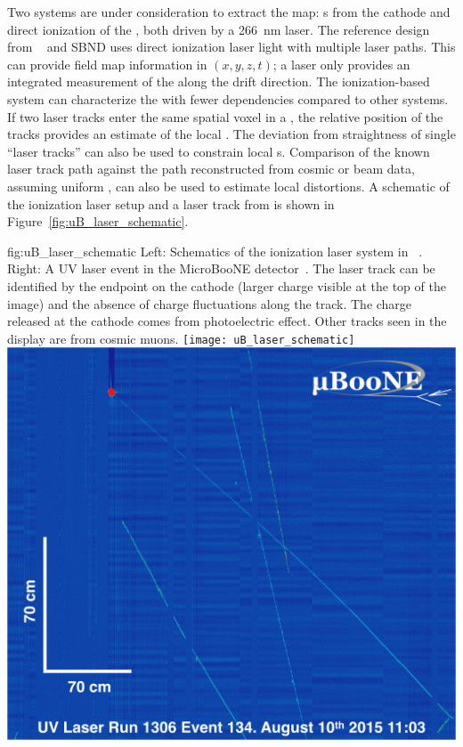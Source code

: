 Two systems are under consideration to extract the \efield map: \phel{}s from the \lartpc cathode and direct ionization of the , both driven by a \SI{266}{\nano\m} laser.  The reference design from ~\cite{bib:uBlaser2019} and SBND uses direct ionization laser light with multiple laser paths. This can provide field map information in $(x, y, z, t)$; a \phel laser only provides an integrated measurement of the \efield along the drift direction.
The ionization-based system can characterize the \efield with fewer dependencies compared to other systems. If two laser tracks enter the same spatial voxel in a , the relative position of the tracks provides an estimate of the local \threed \efield. The deviation from straightness of single ``laser tracks'' can also be used to constrain local \efield{}s. Comparison of the known laser track path against the path reconstructed from cosmic or beam data, assuming uniform \efield, can also be used to estimate local \efield distortions. A schematic of the ionization laser setup and a laser track from  is shown in Figure~\ref{fig:uB_laser_schematic}.


\begin{dunefigure}{fig:uB_laser_schematic}
{Left: Schematics of the ionization laser system in ~\cite{Antonello:2015lea}. Right: A UV laser event in the MicroBooNE detector~\cite{bib:uBlaser2019}. The laser track can be identified by the endpoint on the cathode (larger charge visible at the top of the image) and the absence of charge fluctuations along the track. The charge released at the cathode comes from photoelectric effect. Other tracks seen in the display are from cosmic muons.}
\texttt{[image: uB\_laser\_schematic]}
\includegraphics[width=0.45\linewidth]{graphics/run1306_ev134-2.png}
\end{dunefigure}


